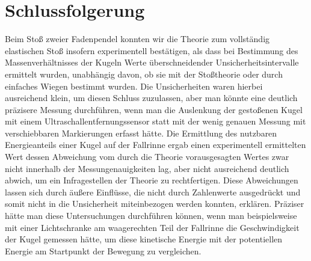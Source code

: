 \documentclass[
	a4paper,
	12pt,
	pagesize,
	ngerman
]{scrartcl}
\begin{document}
	\section{Schlussfolgerung}
	Beim Stoß zweier Fadenpendel konnten wir die Theorie zum vollständig elastischen Stoß insofern experimentell bestätigen, als dass bei Bestimmung des Massenverhältnisses der Kugeln Werte überschneidender Unsicherheitsintervalle ermittelt wurden, unabhängig davon, ob sie mit der Stoßtheorie oder durch einfaches Wiegen bestimmt wurden.
	Die Unsicherheiten waren hierbei ausreichend klein, um diesen Schluss zuzulassen, aber man könnte eine deutlich präzisere Messung durchführen, wenn man die Auslenkung der gestoßenen Kugel mit einem Ultraschallentfernungssensor statt mit der wenig genauen Messung mit verschiebbaren Markierungen erfasst hätte.
	Die Ermittlung des nutzbaren Energieanteils einer Kugel auf der Fallrinne ergab einen experimentell ermittelten Wert dessen Abweichung vom durch die Theorie vorausgesagten Wertes zwar nicht innerhalb der Messungenauigkeiten lag, aber nicht ausreichend deutlich abwich, um ein Infragestellen der Theorie zu rechtfertigen.
	Diese Abweichungen lassen sich durch äußere Einflüsse, die nicht durch Zahlenwerte ausgedrückt und somit nicht in die Unsicherheit miteinbezogen werden konnten, erklären.
	Präziser hätte man diese Untersuchungen durchführen können, wenn man beispielsweise mit einer Lichtschranke am waagerechten Teil der Fallrinne die Geschwindigkeit der Kugel gemessen hätte, um diese kinetische Energie mit der potentiellen Energie am Startpunkt der Bewegung zu vergleichen.
\end{document}
